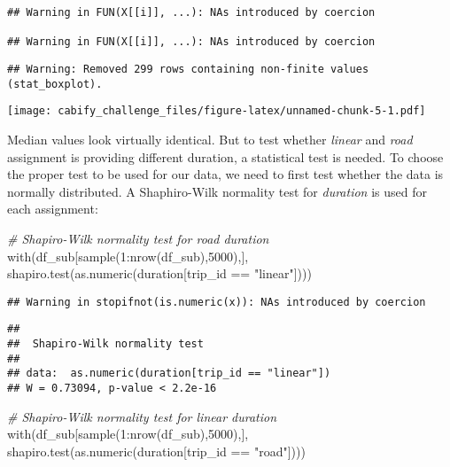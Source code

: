 \documentclass[
]{article}
\newenvironment{Shaded}{\begin{snugshade}}{\end{snugshade}}
\newcommand{\CommentTok}[1]{\textcolor[rgb]{0.56,0.35,0.01}{\textit{#1}}}
\newcommand{\DecValTok}[1]{\textcolor[rgb]{0.00,0.00,0.81}{#1}}
\newcommand{\FunctionTok}[1]{\textcolor[rgb]{0.00,0.00,0.00}{#1}}
\newcommand{\NormalTok}[1]{#1}
\newcommand{\SpecialCharTok}[1]{\textcolor[rgb]{0.00,0.00,0.00}{#1}}
\newcommand{\StringTok}[1]{\textcolor[rgb]{0.31,0.60,0.02}{#1}}
\begin{document}
\begin{verbatim}
## Warning in FUN(X[[i]], ...): NAs introduced by coercion

## Warning in FUN(X[[i]], ...): NAs introduced by coercion
\end{verbatim}

\begin{verbatim}
## Warning: Removed 299 rows containing non-finite values (stat_boxplot).
\end{verbatim}

\texttt{[image: cabify\_challenge\_files/figure-latex/unnamed-chunk-5-1.pdf]}

Median values look virtually identical. But to test whether
\emph{linear} and \emph{road} assignment is providing different
duration, a statistical test is needed. To choose the proper test to be
used for our data, we need to first test whether the data is normally
distributed. A Shaphiro-Wilk normality test for \emph{duration} is used
for each assignment:

\begin{Shaded}
\begin{Highlighting}[]
\CommentTok{\# Shapiro{-}Wilk normality test for road duration}
\FunctionTok{with}\NormalTok{(df\_sub[}\FunctionTok{sample}\NormalTok{(}\DecValTok{1}\SpecialCharTok{:}\FunctionTok{nrow}\NormalTok{(df\_sub),}\DecValTok{5000}\NormalTok{),], }
     \FunctionTok{shapiro.test}\NormalTok{(}\FunctionTok{as.numeric}\NormalTok{(duration[trip\_id }\SpecialCharTok{==} \StringTok{"linear"}\NormalTok{])))}
\end{Highlighting}
\end{Shaded}

\begin{verbatim}
## Warning in stopifnot(is.numeric(x)): NAs introduced by coercion
\end{verbatim}

\begin{verbatim}
## 
##  Shapiro-Wilk normality test
## 
## data:  as.numeric(duration[trip_id == "linear"])
## W = 0.73094, p-value < 2.2e-16
\end{verbatim}

\begin{Shaded}
\begin{Highlighting}[]
\CommentTok{\# Shapiro{-}Wilk normality test for linear duration}
\FunctionTok{with}\NormalTok{(df\_sub[}\FunctionTok{sample}\NormalTok{(}\DecValTok{1}\SpecialCharTok{:}\FunctionTok{nrow}\NormalTok{(df\_sub),}\DecValTok{5000}\NormalTok{),], }
     \FunctionTok{shapiro.test}\NormalTok{(}\FunctionTok{as.numeric}\NormalTok{(duration[trip\_id }\SpecialCharTok{==} \StringTok{"road"}\NormalTok{])))}
\end{Highlighting}
\end{Shaded}
\end{document}
